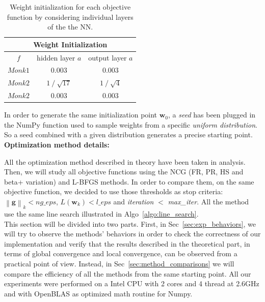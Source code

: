 \documentclass[11pt]{article}
\newcommand{\norm}[1]{\left\lVert#1\right\rVert}
\begin{document}
\begin{table}[H]
\small
    \centering
    \begin{tabular}{|c|c|c|}
        \hline
        \multicolumn{3}{|c|}{\textbf{Weight Initialization}} \\
        \hline
        $f$     &  hidden layer $a$ & output layer $a$\\
        \hline
        $Monk1$ &  0.003 & 0.003 \\
        \hline
        $Monk2$ &  $1\mathbin{/} \sqrt{17}$ & $1\mathbin{/} \sqrt{4}$\\
        \hline
        $Monk2$ & 0.003 & 0.003\\
        \hline

    \end{tabular}
    \caption{Weight initialization for each objective function by considering individual layers of the the NN.}
    \label{tab:weight_init}
\end{table}
In order to generate the same initialization point $\mathbf{w}_0$, a \textit{seed} has been plugged in the NumPy  function used to sample weights from a specific \textit{uniform distribution}. So a seed combined with a given distribution generates a precise starting point.\\

\textbf{Optimization method details:}

All the optimization method described in theory have been taken in analysis. Then, we will study all objective functions using the NCG (FR, PR, HS and beta+ variation) and L-BFGS methods. In order to compare them, on the same objective function, we decided to use those thresholds as stop criteria: $\norm{\mathbf{g}}_k < ng\_eps$, $L(\mathbf{w}_k) < l\_eps$ and \textit{iteration} $<$ \textit{max\_iter}. All the method use the same line search illustrated in Algo~\ref{algo:line_search}.\\

\noindent This section will be divided into two parts. First, in Sec~\ref{sec:exp_behaviors}, we will try to observe the methods' behaviors in order to check the correctness of our implementation and verify that the results described in the theoretical part, in terms of global convergence and local convergence, can be observed from a practical point of view. Instead, in Sec~\ref{sec:method_comparisons} we will compare the efficiency of all the methods from the same starting point. 
All our experiments were performed on a Intel CPU with 2 cores and 4 thread at 2.6GHz and with OpenBLAS as optimized math routine for Numpy.
\end{document}
